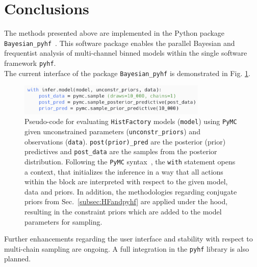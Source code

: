 \section{Conclusions}\label{sec:conclusions}

The methods presented above are implemented in the Python package \texttt{Bayesian\_pyhf}~\cite{BayesianPyhf}. This software package enables the parallel Bayesian and frequentist analysis of multi-channel binned models within the single software framework \texttt{pyhf}.\\
The current interface of the package \texttt{Bayesian\_pyhf} is demonstrated in Fig. \ref{code}.
    \begin{figure} %
        \centering
        \includegraphics[width=9cm]{figures/code2.png}
        \centering
        \caption{Pseudo-code for evaluating \texttt{HistFactory} models (\texttt{model}) using \texttt{PyMC} given unconstrained parameters (\texttt{unconstr\_priors}) and observations (\texttt{data}). \texttt{post(prior)\_pred} are the posterior (prior) predictives and \texttt{post\_data} are the samples from the posterior distribution. Following the \texttt{PyMC} syntax~\cite{PyMC}, the \texttt{with} statement opens a context, that initializes the inference in a way that all actions within the block are interpreted with respect to the given model, data and priors. In addition, the methodologies regarding conjugate priors from Sec.~\ref{subsec:HFandpyhf} are applied under the hood, resulting in the constraint priors which are added to the model parameters for sampling.}
        \label{code}
    \end{figure}
\noindent Further enhancements regarding the user interface and stability with respect to multi-chain sampling are ongoing. A full integration in the \texttt{pyhf} library is also planned.

